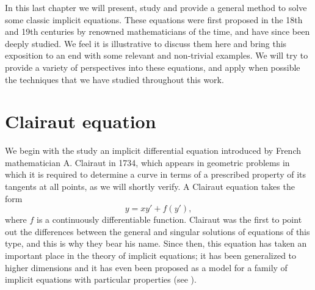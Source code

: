 %
%
%

In this last chapter we will present, study and provide a general method to solve some classic implicit equations. These equations were first proposed in the 18th and 19th centuries by renowned mathematicians of the time, and have since been deeply studied. We feel it is illustrative to discuss them here and bring this exposition to an end with some relevant and non-trivial examples. We will try to provide a variety of perspectives into these equations, and apply when possible the techniques that we have studied throughout this work.

\section{Clairaut equation}

We begin with the study an implicit differential equation introduced by French mathematician A. Clairaut in 1734, which appears in geometric problems in which it is required to determine a curve in terms of a prescribed property of its tangents at all points, as we will shortly verify. A Clairaut equation takes the form
\begin{equation}  \label{eq:clairaut}
  y=xy' + f(y'),
\end{equation}
where $f$ is a continuously differentiable function. Clairaut was the first to point out the differences between the general and singular solutions of equations of this type, and this is why they bear his name. Since then, this equation has taken an important place in the theory of implicit equations; it has been generalized to higher dimensions and it has even been proposed as a model for a family of implicit equations with particular properties (see \cite{dara1975singularites}).

